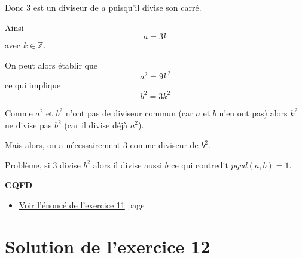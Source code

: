 \documentclass[a4paper,11pt]{book}
\begin{document}
\begin{enumerate}
Donc 3 est un diviseur de \(a\) puisqu'il divise son carré.

Ainsi \[a = 3k\] avec \(k\in\mathbb{Z}\).

On peut alors établir que
\[a^2 = 9k^2\]
ce qui implique \[b^2 = 3k^2\]

Comme \(a^2\) et \(b^2\) n'ont pas de diviseur commun (car \(a\) et
\(b\) n'en ont pas) alors \(k^2\) ne divise pas \(b^2\) (car il
divise déjà \(a^2\)).

Mais alors, on a nécessairement 3 comme diviseur de \(b^2\).

Problème, si 3 divise \(b^2\) alors il divise aussi \(b\) ce qui
contredit \(pgcd(a, b) = 1\).
\end{enumerate}


\textbf{CQFD}

\begin{itemize}
\item \hyperref[org1486a04]{Voir l'énoncé de l'exercice 11}
page~\pageref{page:sec2.6.5exo11}
\end{itemize}


\clearpage

\section{Solution de l'exercice 12}
\label{sec:org5714eb2}
\label{org86d02ad}
\label{page:sec8.6.3sol12}
\end{document}
